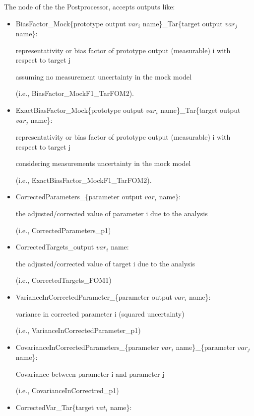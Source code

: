 The  node of the  the  Postprocessor, accepts outputs like:
\begin{itemize}
  \item BiasFactor\_Mock\{prototype output $var_i$  name\}\_Tar\{target output $var_j$ name\}:

    representativity or bias factor of prototype output (measurable) i with respect to target j

    	assuming no measurement uncertainty in the mock model

    	 (i.e., BiasFactor\_MockF1\_TarFOM2).

  \item ExactBiasFactor\_Mock\{prototype output $var_i$ name\}\_Tar\{target output $var_j$ name\}:

   representativity or bias factor of prototype output (measurable) i with respect to target j

    considering measurements uncertainty in the mock model

     (i.e., ExactBiasFactor\_MockF1\_TarFOM2).

  \item CorrectedParameters\_\{parameter output $var_i$ name\}:

  the adjusted/corrected value of parameter i due to the analysis

  (i.e., CorrectedParameters\_p1)

  \item CorrectedTargets\_{output $var_i$ name}:

  the adjusted/corrected value of  target i due to the analysis

  (i.e., CorrectedTargets\_FOM1)

  \item VarianceInCorrectedParameter\_\{parameter output $var_i$ name\}:

 variance in corrected parameter i (squared uncertainty)

  (i.e., VarianceInCorrectedParameter\_p1)

  \item CovarianceInCorrectedParameters\_\{parameter $var_i$ name\}\_\{parameter $var_j$ name\}:

 Covariance between parameter i and parameter j

 (i.e., CovarianceInCorrectred\_p1)

  \item CorrectedVar\_Tar\{target $vat_i$ name\}:


\end{itemize}

